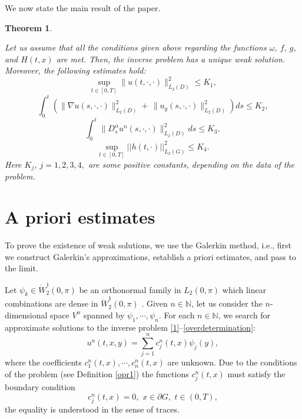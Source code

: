 \documentclass[12pt]{amsart}
\newtheorem{thm}{Theorem}[section]
\theoremstyle{definition}
\numberwithin{equation}{section}
\begin{document}
We now state the main result of the paper.


\begin{thm}\label{theorem 1}

Let us assume that all the conditions given above regarding the functions $\omega$, $f$, $g$, and $H(t, x)$ are met. Then, the inverse problem has a unique weak solution. Moreover, the following estimates hold:
\begin{equation}\label{uestimate1}
 \sup_{t\in [0, T]} \|  u(t, \cdot, \cdot) \|_{L_2(D)}^2\leq K_1 ,
\end{equation}
 \begin{equation}\label{u_xestimate}
\int_0^t \left(\|  \nabla u (s, \cdot, \cdot)\|_{L_2(D)}^2 +  \, \| u_y (s, \cdot, \cdot) \|_{L_2(D)}^2 \right) ds\leq K_2,     
\end{equation}
\begin{equation}\label{Dalphaestimate}
\int_0^t\| D_s^{\alpha} u^n (s, \cdot, \cdot)\|^2_{L_2(D)}d s
    \leq K_3,
\end{equation}
\begin{equation}\label{h_estimate}
   \sup_{t\in [0, T]} ||h(t, \cdot)||_{L_2(G)}^2
    \leq K_4.
\end{equation}
Here $K_j$, $j=1,2,3, 4,$ are some positive constants, depending on the data of the problem.
\end{thm}














\section{A priori estimates}

To prove the existence of weak solutions, we use the Galerkin method, i.e., first we construct Galerkin's approximations, establish a priori estimates, and pass to the limit.

Let $\psi_k\in \dot{W}^1_2(0, \pi)$ be an orthonormal family in $L_2(0, \pi)$ which linear combinations are dense in $\dot{W}^1_2(0, \pi)$ \cite{Lions}. Given $n\in \mathbb{N}$, let us
consider the $n$-dimensional space $V^n$ spanned by $\psi_1, \cdots, \psi_n$. For each
$n\in \mathbb{N}$, we search for approximate solutions
 to the inverse problem \eqref{1}–\eqref{overdetermination}:
\begin{equation}\label{6}
    u^n(t, x, y) = \sum_{j=1}^n c_j^n(t, x) \psi_j(y),
\end{equation}
where the coefficients $c_1^n(t,x), \cdots , c_n^n(t,x)$ are unknown. 
Due to the conditions of the problem (see Definition \ref{opr1}) the functions $c_j^n(t, x)$ must satisfy the boundary condition
\begin{equation}\label{boundary_c}
c_j^n(t, x) = 0,\,\, x\in \partial G,\,\, t\in (0, T),    
\end{equation}
the equality is understood in the sense of traces.
\end{document}
